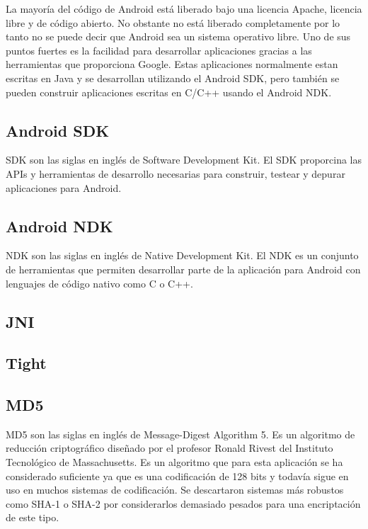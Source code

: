 La mayoría del código de Android está liberado bajo una licencia Apache, licencia libre y de código abierto. No obstante no está liberado completamente por lo tanto no se puede decir que Android sea un sistema operativo libre. Uno de sus puntos fuertes es la facilidad para desarrollar aplicaciones gracias a las herramientas que proporciona Google. Estas aplicaciones normalmente estan escritas en Java y se desarrollan utilizando el Android SDK, pero también se pueden construir aplicaciones escritas en C/C++ usando el Android NDK.\\

\subsection{Android SDK}

SDK son las siglas en inglés de Software Development Kit. El SDK proporcina las APIs y herramientas de desarrollo necesarias para construir, testear y depurar aplicaciones para Android.\\

\subsection{Android NDK}

NDK son las siglas en inglés de Native Development Kit. El NDK es un conjunto de herramientas que permiten desarrollar parte de la aplicación para Android con lenguajes de código nativo como C o C++.\\

\subsection{JNI}

\subsection{Tight}

\subsection{MD5}

MD5 son las siglas en inglés de Message-Digest Algorithm 5. Es un algoritmo de reducción criptográfico diseñado por el profesor Ronald Rivest del Instituto Tecnológico de Massachusetts. Es un algoritmo que para esta aplicación se ha considerado suficiente ya que es una codificación de 128 bits y todavía sigue en uso en muchos sistemas de codificación. Se descartaron sistemas más robustos como SHA-1 o SHA-2 por considerarlos demasiado pesados para una encriptación de este tipo.

